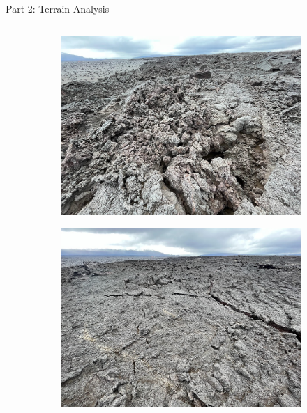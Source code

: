 \documentclass[aspectratio=169]{beamer}
\begin{document}
\begin{frame}{Part 2: Terrain Analysis}
    \begin{columns}
        \begin{column}{0.37\textwidth}
		\vspace{0.10cm}
		\begin{figure}[]
		    \centering
		    \begin{subfigure}[b]{0.9\linewidth}
			\includegraphics[width=\textwidth]{./images/lava_rough}
			\label{figure:whycode_bundle}
		    \end{subfigure}
		    \begin{subfigure}[b]{0.9\linewidth}
			\includegraphics[width=\textwidth]{./images/lava_smooth}
			\label{figure:apriltag24h10}

\end{subfigure}
\end{figure}
\end{column}
\end{columns}
\end{frame}
\end{document}
